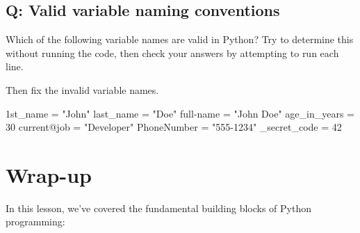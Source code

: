 \documentclass[
  letterpaper,
  DIV=11,
  numbers=noendperiod]{scrreprt}
\newenvironment{Shaded}{\begin{snugshade}}{\end{snugshade}}
\newcommand{\DecValTok}[1]{\textcolor[rgb]{0.68,0.00,0.00}{#1}}
\newcommand{\ErrorTok}[1]{\textcolor[rgb]{0.68,0.00,0.00}{#1}}
\newcommand{\NormalTok}[1]{\textcolor[rgb]{0.00,0.23,0.31}{#1}}
\newcommand{\OperatorTok}[1]{\textcolor[rgb]{0.37,0.37,0.37}{#1}}
\newcommand{\StringTok}[1]{\textcolor[rgb]{0.13,0.47,0.30}{#1}}
\begin{document}
\begin{tcolorbox}[enhanced jigsaw, colframe=quarto-callout-tip-color-frame, opacityback=0, titlerule=0mm, bottomrule=.15mm, breakable, leftrule=.75mm, colbacktitle=quarto-callout-tip-color!10!white, title=\textcolor{quarto-callout-tip-color}{\faLightbulb}\hspace{0.5em}{Practice}, rightrule=.15mm, coltitle=black, opacitybacktitle=0.6, colback=white, left=2mm, arc=.35mm, toptitle=1mm, bottomtitle=1mm, toprule=.15mm]

\subsection{Q: Valid variable naming
conventions}\label{q-valid-variable-naming-conventions}

Which of the following variable names are valid in Python? Try to
determine this without running the code, then check your answers by
attempting to run each line.

Then fix the invalid variable names.

\begin{Shaded}
\begin{Highlighting}[]
\DecValTok{1}\ErrorTok{st\_name} \OperatorTok{=} \StringTok{"John"}
\NormalTok{last\_name }\OperatorTok{=} \StringTok{"Doe"}
\NormalTok{full}\OperatorTok{{-}}\NormalTok{name }\OperatorTok{=} \StringTok{"John Doe"}
\NormalTok{age\_in\_years }\OperatorTok{=} \DecValTok{30}
\NormalTok{current}\OperatorTok{@}\NormalTok{job }\OperatorTok{=} \StringTok{"Developer"}
\NormalTok{PhoneNumber }\OperatorTok{=} \StringTok{"555{-}1234"}
\NormalTok{\_secret\_code }\OperatorTok{=} \DecValTok{42}
\end{Highlighting}
\end{Shaded}

\end{tcolorbox}

\section{Wrap-up}\label{wrap-up}

In this lesson, we've covered the fundamental building blocks of Python
programming:
\end{document}
